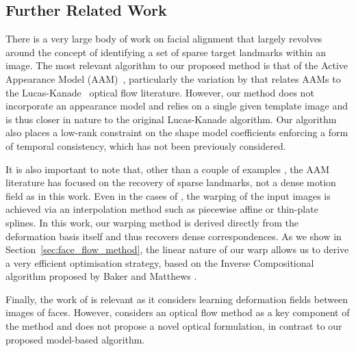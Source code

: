 \subsection{Further Related Work}\label{subsec:face_flow_further_related_work}
There is a very large body of work on facial alignment that largely revolves
around the concept of identifying a set of sparse target landmarks within an
image. The most relevant algorithm to our proposed method is that of the
Active Appearance Model (AAM)~\cite{cootes2001active}, particularly the
variation by \citet{matthews2004active} that relates AAMs to the 
Lucas-Kanade~\cite{lucas1981iterative,baker2004lucas} optical flow literature. 
However, our method does not incorporate an appearance model and relies on a 
single given template image and is thus closer in nature to the original 
Lucas-Kanade algorithm. 
Our algorithm also places a low-rank constraint on the shape model coefficients
enforcing a form of temporal consistency, which has not been previously 
considered.

It is also important to note that, other than a couple of examples
\cite{ramnath2008increasing,anderson2014using}, the AAM literature has focused
on the recovery of sparse landmarks, not a dense motion field as in this work.
Even in the cases of \citet{ramnath2008increasing,anderson2014using}, 
the warping of the input images is achieved via an interpolation method such as
piecewise affine or thin-plate splines. In this work, our warping
method is derived directly from the deformation basis itself and thus recovers
dense correspondences.
As we show in Section~\ref{sec:face_flow_method}, the linear nature of our warp
allows us to derive a very efficient optimisation strategy,
based on the Inverse Compositional algorithm proposed by Baker and Matthews
\cite{baker2004lucas}. 

Finally, the work of \citet{kemelmacher2012collection}
is relevant as it considers learning deformation fields between images of faces.
However, \citet{kemelmacher2012collection} considers an optical flow method
as a key component of the method and does not propose a novel optical
formulation, in contrast to our proposed model-based algorithm.
